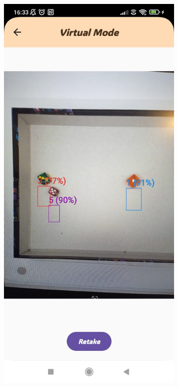 \begin{figure}[ht!]
\begin{subfigure}[b]{0.27\textwidth}
    \end{subfigure}
    \hfill
    \begin{subfigure}[b]{0.27\textwidth}
        \includegraphics[width=\textwidth]{img/virtual screen2.jpg}

\end{subfigure}
\end{figure}
